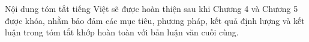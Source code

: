 \begin{TKTAbstractVI}
Nội dung tóm tắt tiếng Việt sẽ được hoàn thiện sau khi Chương 4 và Chương 5 được khóa, nhằm bảo đảm các mục tiêu, phương pháp, kết quả định lượng và kết luận trong tóm tắt khớp hoàn toàn với bản luận văn cuối cùng.
\end{TKTAbstractVI}
